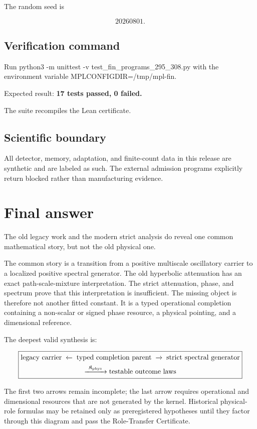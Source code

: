 \documentclass[11pt,a4paper,openany]{report}
\begin{document}
The random seed is

\[
20260801.
\]

\section{Verification command}

Run python3 -m unittest -v test\_fin\_programs\_295\_308.py with the environment variable MPLCONFIGDIR=/\allowbreak{}tmp/\allowbreak{}mpl-fin.

Expected result: \textbf{17 tests passed, 0 failed.}

The suite recompiles the Lean certificate.

\section{Scientific boundary}

All detector, memory, adaptation, and finite-count data in this release are synthetic and are labeled as such. The external admission programs explicitly return blocked rather than manufacturing evidence.

\chapter{Final answer}

The old legacy work and the modern strict analysis do reveal one common mathematical story, but not the old physical one.

The common story is a transition from a positive multiscale oscillatory carrier to a localized positive spectral generator. The old hyperbolic attenuation has an exact path-scale-mixture interpretation. The strict attenuation, phase, and spectrum prove that this interpretation is insufficient. The missing object is therefore not another fitted constant. It is a typed operational completion containing a non-scalar or signed phase resource, a physical pointing, and a dimensional reference.

The deepest valid synthesis is:

\[
\boxed{
\begin{gathered}
\text{legacy carrier}
\;\xleftarrow{\ }\;
\text{typed completion parent}
\;\xrightarrow{\ }\;
\text{strict spectral generator}\\
\xrightarrow{\ \mathfrak K_{\rm phys}\ }
\text{testable outcome laws}
\end{gathered}
}
\]

The first two arrows remain incomplete; the last arrow requires operational and dimensional resources that are not generated by the kernel. Historical physical-role formulas may be retained only as preregistered hypotheses until they factor through this diagram and pass the Role-Transfer Certificate.
\end{document}
